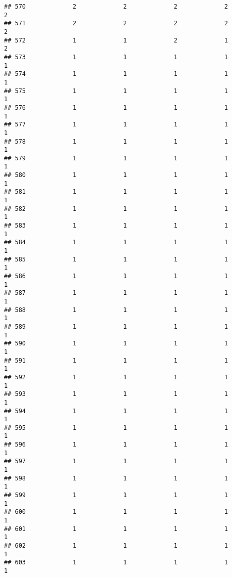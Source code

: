 \documentclass[
]{article}
\begin{document}
\begin{verbatim}
## 570             2             2             2             2             2
## 571             2             2             2             2             2
## 572             1             1             2             1             2
## 573             1             1             1             1             1
## 574             1             1             1             1             1
## 575             1             1             1             1             1
## 576             1             1             1             1             1
## 577             1             1             1             1             1
## 578             1             1             1             1             1
## 579             1             1             1             1             1
## 580             1             1             1             1             1
## 581             1             1             1             1             1
## 582             1             1             1             1             1
## 583             1             1             1             1             1
## 584             1             1             1             1             1
## 585             1             1             1             1             1
## 586             1             1             1             1             1
## 587             1             1             1             1             1
## 588             1             1             1             1             1
## 589             1             1             1             1             1
## 590             1             1             1             1             1
## 591             1             1             1             1             1
## 592             1             1             1             1             1
## 593             1             1             1             1             1
## 594             1             1             1             1             1
## 595             1             1             1             1             1
## 596             1             1             1             1             1
## 597             1             1             1             1             1
## 598             1             1             1             1             1
## 599             1             1             1             1             1
## 600             1             1             1             1             1
## 601             1             1             1             1             1
## 602             1             1             1             1             1
## 603             1             1             1             1             1

\end{verbatim}
\end{document}
